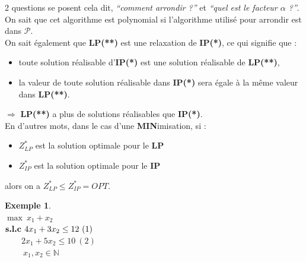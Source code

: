\documentclass{article}
\newcommand{\N}{\mathbb{N}}
\newtheorem{exemple}{Exemple}[section]
\begin{document}
\begin{sffamily}
2 questions se posent cela dit, \textit{``comment arrondir ?''} et \textit{``quel est le facteur $\alpha$ ?''}.\\
On sait que cet algorithme est polynomial si l'algorithme utilisé pour arrondir est dans $\mathcal{P}$. \\
On sait également que \textbf{LP(**)} est une relaxation de \textbf{IP(*)}, ce qui signifie que :
\begin{itemize}
\item toute solution réalisable d'\textbf{IP(*)} est une solution réalisable de \textbf{LP(**)},
\item la valeur de toute solution réalisable dans \textbf{IP(*)} sera égale à la même valeur dans \textbf{LP(**)}.
\end{itemize}
$\Rightarrow$ \textbf{LP(**)} a plus de solutions réalisables que \textbf{IP(*)}. \\
En d'autres mots, dans le cas d'une \textbf{MIN}imisation, si :
\begin{itemize}
\item $Z^*_{LP}$ est la solution optimale pour le \textbf{LP}
\item $Z^*_{IP}$ est la solution optimale pour le \textbf{IP}
\end{itemize}
alors on a $\boxed{Z^*_{LP} \leq Z^*_{IP} = OPT}$.

\begin{exemple}$ $\\
$\max\ x_1+x_2$ \\
\indent $\text{\textbf{s.l.c }} 4x_1 + 3x_2 \leq 12\ (1)$ \\
\indent	$\qquad 2x_1 + 5x_2 \leq 10\ (2)$ \\
\indent $\qquad\ x_1, x_2 \in \N$


\end{exemple}
\end{sffamily}
\end{document}
